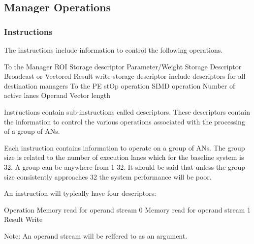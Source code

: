 \documentclass[journal]{IEEEtran}
\begin{document}
\subsection{Manager Operations}
\label{sec:Manager Operations}

\subsubsection{Instructions}
\label{ssec:Instructions}
The instructions include information to control the following operations.

\begin{outline}
        \1 To the Manager
            \2 ROI Storage descriptor
            \2 Parameter/Weight Storage Descriptor
                \3 Broadcast or Vectored
            \2 Result write storage descriptor
                \3 include descriptors for all destination managers
        \1 To the PE
            \2 stOp operation
            \2 SIMD operation
            \2 Number of active lanes
            \2 Operand Vector length
\end{outline}


Instructions contain sub-instructions called descriptors. These descriptors contain the information to control the various operations associated with the processing of a group of ANs.

Each instruction contains information to operate on a group of ANs.
The group size is related to the number of execution lanes which for the baseline system is 32. A group can be anywhere from 1-32. It should be said that unless the group size consistently approaches 32 the system performance will be poor.

An instruction will typically have four descriptors:

\begin{outline}
\renewcommand{\outlinei}{enumerate}
    \1 Operation
    \1 Memory read for operand stream 0
    \1 Memory read for operand stream 1
    \1 Result Write
\end{outline}

Note: An operand stream will be reffered to as an argument.
\end{document}
